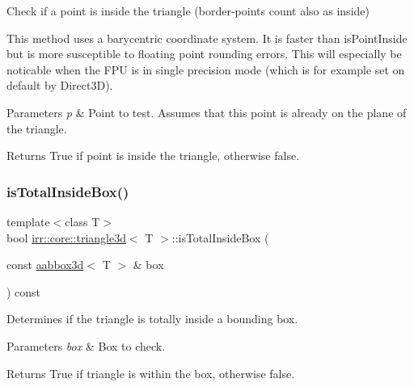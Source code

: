 Check if a point is inside the triangle (border-\/points count also as inside) 

This method uses a barycentric coordinate system. It is faster than is\+Point\+Inside but is more susceptible to floating point rounding errors. This will especially be noticable when the F\+PU is in single precision mode (which is for example set on default by Direct3D). 
\begin{DoxyParams}{Parameters}
{\em p} & Point to test. Assumes that this point is already on the plane of the triangle. \\
\hline
\end{DoxyParams}
\begin{DoxyReturn}{Returns}
True if point is inside the triangle, otherwise false. 
\end{DoxyReturn}
\mbox{\label{classirr_1_1core_1_1triangle3d_a9baf7f6b0d49b8046f434cf0829eb8fd}} 
\subsubsection{\texorpdfstring{is\+Total\+Inside\+Box()}{isTotalInsideBox()}}
{\footnotesize\ttfamily template$<$class T$>$ \\
bool \hyperlink{classirr_1_1core_1_1triangle3d}{irr\+::core\+::triangle3d}$<$ T $>$\+::is\+Total\+Inside\+Box (\begin{DoxyParamCaption}\item[{const \hyperlink{classirr_1_1core_1_1aabbox3d}{aabbox3d}$<$ T $>$ \&}]{box }\end{DoxyParamCaption}) const\hspace{0.3cm}{\ttfamily [inline]}}



Determines if the triangle is totally inside a bounding box. 


\begin{DoxyParams}{Parameters}
{\em box} & Box to check. \\
\hline
\end{DoxyParams}
\begin{DoxyReturn}{Returns}
True if triangle is within the box, otherwise false. 
\end{DoxyReturn}
\mbox{\label{classirr_1_1core_1_1triangle3d_ac191abc19290c4a7fcad9af3a5707bc1}} 

